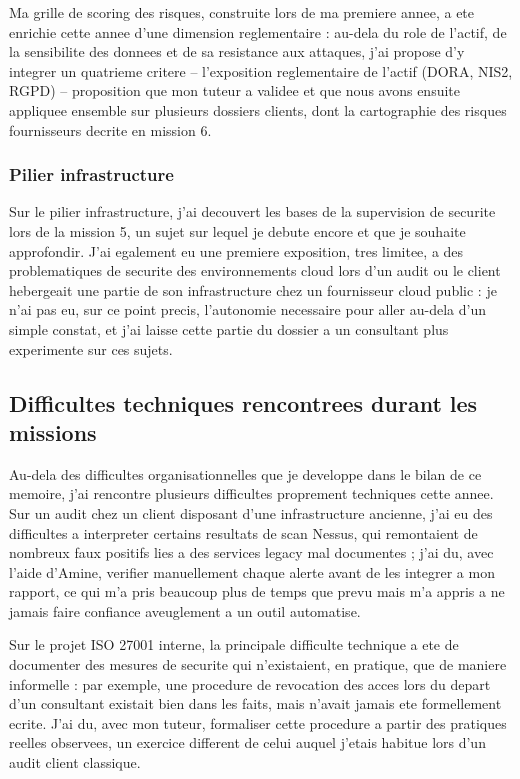 \documentclass[11pt,a4paper]{article}
\begin{document}
Ma grille de scoring des risques, construite lors de ma premiere annee, a ete enrichie cette annee d'une dimension reglementaire : au-dela du role de l'actif, de la sensibilite des donnees et de sa resistance aux attaques, j'ai propose d'y integrer un quatrieme critere -- l'exposition reglementaire de l'actif (DORA, NIS2, RGPD) -- proposition que mon tuteur a validee et que nous avons ensuite appliquee ensemble sur plusieurs dossiers clients, dont la cartographie des risques fournisseurs decrite en mission 6.

\subsubsection*{Pilier infrastructure}

Sur le pilier infrastructure, j'ai decouvert les bases de la supervision de securite lors de la mission 5, un sujet sur lequel je debute encore et que je souhaite approfondir. J'ai egalement eu une premiere exposition, tres limitee, a des problematiques de securite des environnements cloud lors d'un audit ou le client hebergeait une partie de son infrastructure chez un fournisseur cloud public : je n'ai pas eu, sur ce point precis, l'autonomie necessaire pour aller au-dela d'un simple constat, et j'ai laisse cette partie du dossier a un consultant plus experimente sur ces sujets.

\subsection{Difficultes techniques rencontrees durant les missions}

Au-dela des difficultes organisationnelles que je developpe dans le bilan de ce memoire, j'ai rencontre plusieurs difficultes proprement techniques cette annee. Sur un audit chez un client disposant d'une infrastructure ancienne, j'ai eu des difficultes a interpreter certains resultats de scan Nessus, qui remontaient de nombreux faux positifs lies a des services legacy mal documentes ; j'ai du, avec l'aide d'Amine, verifier manuellement chaque alerte avant de les integrer a mon rapport, ce qui m'a pris beaucoup plus de temps que prevu mais m'a appris a ne jamais faire confiance aveuglement a un outil automatise.

Sur le projet ISO 27001 interne, la principale difficulte technique a ete de documenter des mesures de securite qui n'existaient, en pratique, que de maniere informelle : par exemple, une procedure de revocation des acces lors du depart d'un consultant existait bien dans les faits, mais n'avait jamais ete formellement ecrite. J'ai du, avec mon tuteur, formaliser cette procedure a partir des pratiques reelles observees, un exercice different de celui auquel j'etais habitue lors d'un audit client classique.
\end{document}
